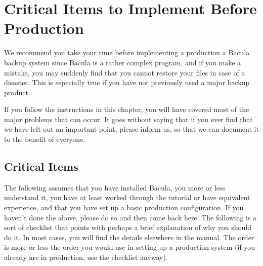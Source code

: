 
\chapter{Critical Items to Implement Before Production}
\label{CriticalChapter}

We recommend you take your time before implementing a production a Bacula
backup system since Bacula is a rather complex program, and if you make a
mistake, you may suddenly find that you cannot restore your files in case
of a disaster.  This is especially true if you have not previously used a
major backup product.

If you follow the instructions in this chapter, you will have covered most of
the major problems that can occur. It goes without saying that if you ever
find that we have left out an important point, please inform us, so
that we can document it to the benefit of everyone. 

\label{Critical}
\section{Critical Items}

The following assumes that you have installed Bacula, you more or less
understand it, you have at least worked through the tutorial or have
equivalent experience, and that you have set up a basic production
configuration. If you haven't done the above, please do so and then come back
here. The following is a sort of checklist that points with perhaps a brief
explanation of why you should do it.  In most cases, you will find the
details elsewhere in the manual.  The order is more or less the order you
would use in setting up a production system (if you already are in
production, use the checklist anyway).

